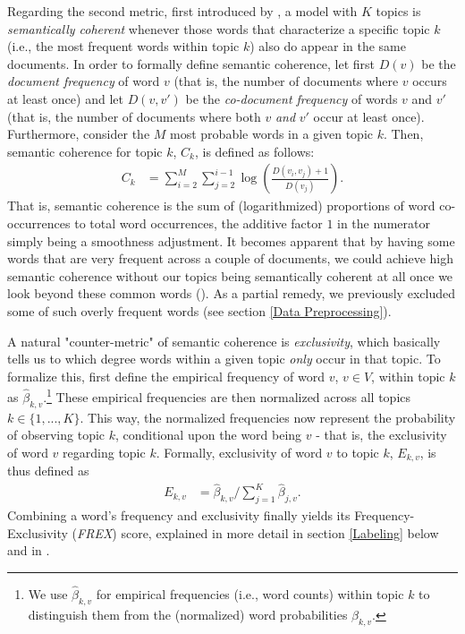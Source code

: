 Regarding the second metric, first introduced by \cite{mimno2011optimizing}, a model with $K$ topics is \textit{semantically coherent} whenever those words that characterize a specific topic $k$ (i.e., the most frequent words within topic $k$) also do appear in the same documents. In order to formally define semantic coherence, let first $D(v)$ be the \textit{document frequency} of word $v$ (that is, the number of documents where $v$ occurs at least once) and let $D(v, v')$ be the \textit{co-document frequency} of words $v$ and $v'$ (that is, the number of documents where both $v$ \textit{and} $v'$ occur at least once). Furthermore, consider the $M$ most probable words in a given topic $k$. Then, semantic coherence for topic $k$, $C_{k}$, is defined as follows:
\begin{align*}
C_{k} &= \sum_{i=2}^{M}\sum_{j=2}^{i-1}\log(\frac{D(v_{i}, v_{j})+1}{D(v_{j})}).
\end{align*}
That is, semantic coherence is the sum of (logarithmized) proportions of word co-occurrences to total word occurrences, the additive factor $1$ in the numerator simply being a smoothness adjustment. It becomes apparent that by having some words that are very frequent across a couple of documents, we could achieve high semantic coherence without our topics being semantically coherent at all once we look beyond these common words (\citealp{stm, mimno2011optimizing}). As a partial remedy, we previously excluded some of such overly frequent words (see section \ref{Data Preprocessing}).

A natural "counter-metric" of semantic coherence is \textit{exclusivity}, which basically tells us to which degree words within a given topic \textit{only} occur in that topic. To formalize this, first define the empirical frequency of word $v$, $v\in{V}$, within topic $k$ as $\hat{\beta}_{k,v}$.\footnote{We use $\hat{\beta}_{k,v}$ for empirical frequencies (i.e., word counts) within topic $k$ to distinguish them from the (normalized) word probabilities $\beta_{k,v}$.} These empirical frequencies are then normalized across all topics $k\in\{1,...,K\}$. This way, the normalized frequencies now represent the probability of observing topic $k$, conditional upon the word being $v$ - that is, the exclusivity of word $v$ regarding topic $k$. Formally, exclusivity of word $v$ to topic $k$, $E_{k,v}$, is thus defined as
\begin{align*}
E_{k,v} &= \hat{\beta}_{k,v}/\sum_{j=1}^{K}\hat{\beta}_{j,v}.
\end{align*}
Combining a word's frequency and exclusivity finally yields its Frequency-Exclusivity (\textit{FREX}) score, explained in more detail in section \ref{Labeling} below and in \cite{bischof2012summarizing}.


